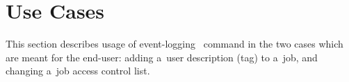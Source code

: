 \section{Use Cases}

This section describes usage of event-logging \LB\ command in the two
cases which are meant for the end-user: adding a~user description (tag)
to a~job, and changing a~job access control list.




